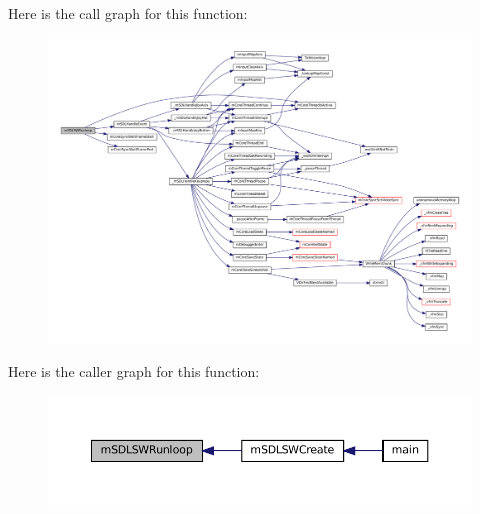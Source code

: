 Here is the call graph for this function\+:
\nopagebreak
\begin{figure}[H]
\begin{center}
\leavevmode
\includegraphics[width=350pt]{sw-sdl_8c_a96edfd01d5672d6808d8d91f3053d79d_cgraph}
\end{center}
\end{figure}
Here is the caller graph for this function\+:
\nopagebreak
\begin{figure}[H]
\begin{center}
\leavevmode
\includegraphics[width=350pt]{sw-sdl_8c_a96edfd01d5672d6808d8d91f3053d79d_icgraph}
\end{center}
\end{figure}
